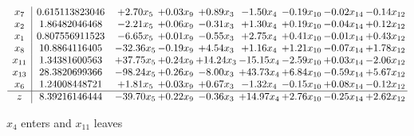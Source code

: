 \documentclass[8pt]{article}
\begin{document}
 \[\begin{array}{c| c c@{\hskip 2pt} c@{\hskip 2pt} c@{\hskip 2pt} c@{\hskip 2pt} c@{\hskip 2pt} c@{\hskip 2pt} c@{\hskip 2pt} }
 x_{7}   &  0.615113823046 & +  2.70 x_{5} & +  0.03 x_{9} & +  0.89 x_{3} & -1.50 x_{4} & -0.19 x_{10} & -0.02 x_{14} & -0.14 x_{12}\\
 x_{2}   &  1.86482046468 & -2.21 x_{5} & +  0.06 x_{9} & -0.31 x_{3} & +  1.30 x_{4} & +  0.19 x_{10} & -0.04 x_{14} & +  0.12 x_{12}\\
 x_{1}   &  0.807556911523 & -6.65 x_{5} & +  0.01 x_{9} & -0.55 x_{3} & +  2.75 x_{4} & +  0.41 x_{10} & -0.01 x_{14} & +  0.43 x_{12}\\
 x_{8}   &  10.8864116405 & -32.36 x_{5} & -0.19 x_{9} & +  4.54 x_{3} & +  1.16 x_{4} & +  1.21 x_{10} & -0.07 x_{14} & +  1.78 x_{12}\\
 x_{11}   &  1.34381600563 & + 37.75 x_{5} & +  0.24 x_{9} & + 14.24 x_{3} & -15.15 x_{4} & -2.59 x_{10} & +  0.03 x_{14} & -2.06 x_{12}\\
 x_{13}   &  28.3820699366 & -98.24 x_{5} & +  0.26 x_{9} & -8.00 x_{3} & + 43.73 x_{4} & +  6.84 x_{10} & -0.59 x_{14} & +  5.67 x_{12}\\
 x_{6}   &  1.24008448721 & +  1.81 x_{5} & +  0.03 x_{9} & +  0.67 x_{3} & -1.32 x_{4} & -0.15 x_{10} & +  0.08 x_{14} & -0.12 x_{12}\\
\hline
z    &  8.39216146444 & -39.70 x_{5} & +  0.22 x_{9} & -0.36 x_{3} & + 14.97 x_{4} & +  2.76 x_{10} & -0.25 x_{14} & +  2.62 x_{12}\\
\end{array}\]


 $ x_{4} $ enters and $ x_{11} $ leaves 
\end{document}
